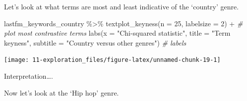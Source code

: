 \documentclass[
]{article}
\newenvironment{Shaded}{\begin{snugshade}}{\end{snugshade}}
\newcommand{\AttributeTok}[1]{\textcolor[rgb]{0.77,0.63,0.00}{#1}}
\newcommand{\CommentTok}[1]{\textcolor[rgb]{0.56,0.35,0.01}{\textit{#1}}}
\newcommand{\DecValTok}[1]{\textcolor[rgb]{0.00,0.00,0.81}{#1}}
\newcommand{\FunctionTok}[1]{\textcolor[rgb]{0.00,0.00,0.00}{#1}}
\newcommand{\NormalTok}[1]{#1}
\newcommand{\SpecialCharTok}[1]{\textcolor[rgb]{0.00,0.00,0.00}{#1}}
\newcommand{\StringTok}[1]{\textcolor[rgb]{0.31,0.60,0.02}{#1}}
\begin{document}
Let's look at what terms are most and least indicative of the `country' genre.

\begin{Shaded}
\begin{Highlighting}[]
\NormalTok{lastfm\_keywords\_country }\SpecialCharTok{\%\textgreater{}\%} 
  \FunctionTok{textplot\_keyness}\NormalTok{(}\AttributeTok{n =} \DecValTok{25}\NormalTok{, }\AttributeTok{labelsize =} \DecValTok{2}\NormalTok{) }\SpecialCharTok{+} \CommentTok{\# plot most contrastive terms}
  \FunctionTok{labs}\NormalTok{(}\AttributeTok{x =} \StringTok{"Chi{-}squared statistic"}\NormalTok{, }
       \AttributeTok{title =} \StringTok{"Term keyness"}\NormalTok{, }
       \AttributeTok{subtitle =} \StringTok{"Country versus other genres"}\NormalTok{) }\CommentTok{\# labels}
\end{Highlighting}
\end{Shaded}

\begin{center}\texttt{[image: 11-exploration\_files/figure-latex/unnamed-chunk-19-1]} \end{center}

Interpretation\ldots.

Now let's look at the `Hip hop' genre.

\begin{Shaded}
\end{Shaded}
\end{document}
